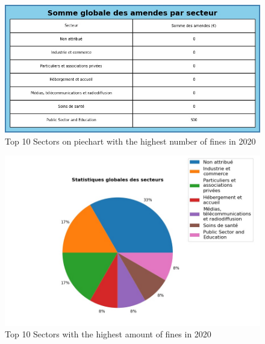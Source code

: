 \documentclass[12pt]{article}
\begin{document}
		
	\begin{multicols}{2}
	\begin{figure}
		[H]\centering\includegraphics[width=1.0\linewidth]{graphs/sector_data_year_fines}
		\caption{Top 10 Sectors on piechart with the highest number of fines in 2020}
	\end{figure}
	\begin{figure}
		[H]\centering\includegraphics[width=1\linewidth]{graphs/sector_data_year}
		\caption{Top 10 Sectors with the highest amount of fines in 2020}
	 \end{figure}
	
	\end{multicols}
\end{document}
